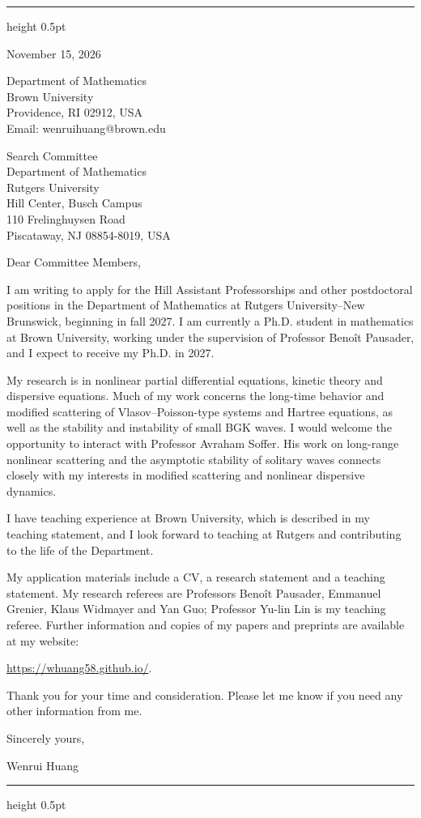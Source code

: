 \documentclass[10pt]{article}
\begin{document}
\vspace{0.08in}
\hrule height 0.5pt

\vspace{0.47in}
\hfill
\begin{minipage}{2.27in}
November 15, 2026

\vspace{0.16in}
Department of Mathematics\\
Brown University\\
Providence, RI 02912, USA\\
Email: wenrui\textunderscore huang@brown.edu
\end{minipage}

\vspace{0.30in}
Search Committee\\
Department of Mathematics\\
Rutgers University\\
Hill Center, Busch Campus\\
110 Frelinghuysen Road\\
Piscataway, NJ 08854-8019, USA

\vspace{0.16in}
Dear Committee Members,

I am writing to apply for the Hill Assistant Professorships and other postdoctoral positions in the Department of Mathematics at Rutgers University--New Brunswick, beginning in fall 2027. I am currently a Ph.D. student in mathematics at Brown University, working under the supervision of Professor Beno\^{i}t Pausader, and I expect to receive my Ph.D. in 2027.

My research is in nonlinear partial differential equations, kinetic theory and dispersive equations. Much of my work concerns the long-time behavior and modified scattering of Vlasov--Poisson-type systems and Hartree equations, as well as the stability and instability of small BGK waves. I would welcome the opportunity to interact with Professor Avraham Soffer. His work on long-range nonlinear scattering and the asymptotic stability of solitary waves connects closely with my interests in modified scattering and nonlinear dispersive dynamics.

I have teaching experience at Brown University, which is described in my teaching statement, and I look forward to teaching at Rutgers and contributing to the life of the Department.

My application materials include a CV, a research statement and a teaching statement. My research referees are Professors Beno\^{i}t Pausader, Emmanuel Grenier, Klaus Widmayer and Yan Guo; Professor Yu-lin Lin is my teaching referee. Further information and copies of my papers and preprints are available at my website:

\url{https://whuang58.github.io/}.

\medskip
Thank you for your time and consideration. Please let me know if you need any other information from me.

\vspace{0.12in}
Sincerely yours,

\vspace{0.12in}
Wenrui Huang

\vfill
\hrule height 0.5pt
\end{document}
